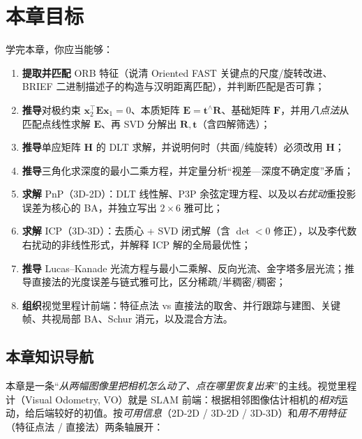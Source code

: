 \section*{本章目标}
学完本章，你应当能够：
\begin{enumerate}
  \item \textbf{提取并匹配} ORB 特征（说清 Oriented FAST 关键点的尺度/旋转改进、BRIEF 二进制描述子的构造与汉明距离匹配），并判断匹配是否可靠；
  \item \textbf{推导}对极约束 $\mathbf{x}_2^\top\mathbf{E}\mathbf{x}_1=0$、本质矩阵 $\mathbf{E}=\mathbf{t}^\wedge\mathbf{R}$、基础矩阵 $\mathbf{F}$，并用\emph{八点法}从匹配点线性求解 $\mathbf{E}$、再 SVD 分解出 $\mathbf{R},\mathbf{t}$（含四解筛选）；
  \item \textbf{推导}单应矩阵 $\mathbf{H}$ 的 DLT 求解，并说明何时（共面/纯旋转）必须改用 $\mathbf{H}$；
  \item \textbf{推导}三角化求深度的最小二乘方程，并定量分析“视差—深度不确定度”矛盾；
  \item \textbf{求解} PnP（3D-2D）：DLT 线性解、P3P 余弦定理方程、以及以\emph{右扰动}重投影误差为核心的 BA，并独立写出 $2\times6$ 雅可比；
  \item \textbf{求解} ICP（3D-3D）：去质心 + SVD 闭式解（含 $\det<0$ 修正），以及李代数右扰动的非线性形式，并解释 ICP 解的全局最优性；
  \item \textbf{推导} Lucas--Kanade 光流方程与最小二乘解、反向光流、金字塔多层光流；推导直接法的光度误差与链式雅可比，区分稀疏/半稠密/稠密；
  \item \textbf{组织}视觉里程计前端：特征点法 vs 直接法的取舍、并行跟踪与建图、关键帧、共视局部 BA、Schur 消元，以及混合方法。
\end{enumerate}

\subsection*{本章知识导航}
本章是一条“\emph{从两幅图像里把相机怎么动了、点在哪里恢复出来}”的主线。视觉里程计（Visual Odometry, VO）就是 SLAM 前端：根据相邻图像估计相机的\emph{相对}运动，给后端较好的初值\cite{carlone2026handbook,gaoxiang2019slam14}。按\emph{可用信息}（2D-2D / 3D-2D / 3D-3D）和\emph{用不用特征}（特征点法 / 直接法）两条轴展开：

